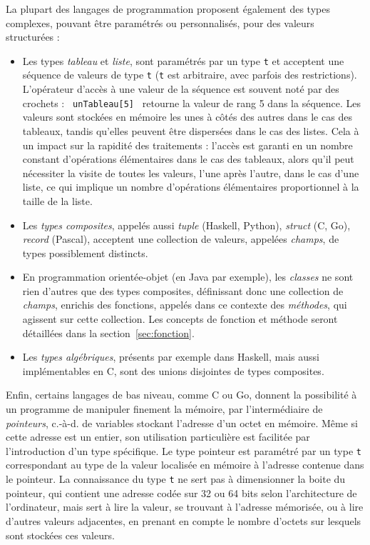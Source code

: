 \documentclass[a4paper,francais]{insalyon}
\newcommand{\cad}{c.-à-d.}
\begin{document}
La plupart des langages de programmation proposent également des types complexes, pouvant être paramétrés ou personnalisés, pour des valeurs structurées :
\begin{itemize}
\item Les types \emph{tableau} et \emph{liste}, sont paramétrés par un type \texttt{t} et acceptent une séquence de valeurs de type \texttt{t} (\texttt{t} est arbitraire, avec parfois des restrictions). L'opérateur d'accès à une valeur de la séquence est souvent noté par des crochets : \verb! unTableau[5] ! retourne la valeur de rang 5 dans la séquence. Les valeurs sont stockées en mémoire les unes à côtés des autres dans le cas des tableaux, tandis qu'elles peuvent être dispersées dans le cas des listes. Cela à un impact sur la rapidité des traitements : l'accès est garanti en un nombre constant d'opérations élémentaires dans le cas des tableaux, alors qu'il peut nécessiter la visite de toutes les valeurs, l'une après l'autre, dans le cas d'une liste, ce qui implique un nombre d'opérations élémentaires proportionnel à la taille de la liste.
\item Les \emph{types composites}, appelés aussi \emph{tuple} (Haskell, Python), \emph{struct} (C, Go), \emph{record} (Pascal), acceptent une collection de valeurs, appelées \emph{champs}, de types possiblement distincts. 
\item En programmation orientée-objet (en Java par exemple), les \emph{classes} ne sont rien d'autres que des types composites, définissant donc une collection de \emph{champs}, enrichis des fonctions, appelés dans ce contexte des \emph{méthodes}, qui agissent sur cette collection. Les concepts de fonction et méthode seront détaillées dans la section~\ref{sec:fonction}.
\item Les \emph{types algébriques}, présents par exemple dans Haskell, mais aussi implémentables en C, sont des unions disjointes de types composites.   
\end{itemize}


Enfin, certains langages de bas niveau, comme C ou Go, donnent la possibilité à un programme de manipuler finement la mémoire, par l'intermédiaire de \emph{pointeurs}, {\cad} de variables stockant l'adresse d'un octet en mémoire. Même si cette adresse est un entier, son utilisation particulière est facilitée par l'introduction d'un type spécifique. Le type pointeur est paramétré par un type \texttt{t} correspondant au type de la valeur localisée en mémoire à l'adresse contenue dans le pointeur. La connaissance du type \texttt{t} ne sert pas à dimensionner la boite du pointeur, qui contient une adresse codée sur 32 ou 64 bits selon l'architecture de l'ordinateur, mais sert à lire la valeur, se trouvant à l'adresse mémorisée, ou à lire d'autres valeurs adjacentes, en prenant en compte le nombre d'octets sur lesquels sont stockées ces valeurs.
\end{document}
